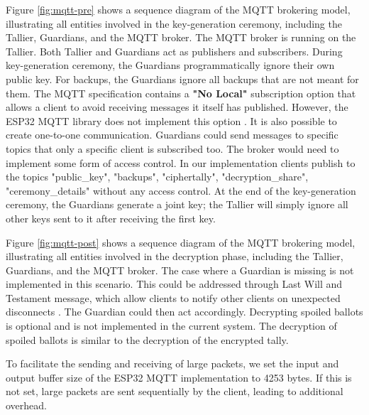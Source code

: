 Figure \ref{fig:mqtt-pre} shows a sequence diagram of the \ac{MQTT} brokering model, illustrating all entities involved in the key-generation ceremony, including the Tallier, Guardians, and the \ac{MQTT} broker. The \ac{MQTT} broker is running on the Tallier. Both Tallier and Guardians act as publishers and subscribers. During key-generation ceremony, the Guardians programmatically ignore their own public key. For backups, the Guardians ignore all backups that are not meant for them. The \ac{MQTT} specification contains a \textbf{"No Local"} \cite[73]{mqtt-v5.0} subscription option that allows a client to avoid receiving messages it itself has published. However, the ESP32 \ac{MQTT} library does not implement this option \cite[53]{esp-prog}. It is also possible to create one-to-one communication. Guardians could send messages to specific topics that only a specific client is subscribed too. The broker would need to implement some form of access control. In our implementation clients publish to the topics "public\_key", "backups", "ciphertally", "decryption\_share", "ceremony\_details" without any access control. At the end of the key-generation ceremony, the Guardians generate a joint key; the Tallier will simply ignore all other keys sent to it after receiving the first key.

Figure \ref{fig:mqtt-post} shows a sequence diagram of the \ac{MQTT} brokering model, illustrating all entities involved in the decryption phase, including the Tallier, Guardians, and the \ac{MQTT} broker. The case where a Guardian is missing is not implemented in this scenario. This could be addressed through Last Will and Testament message, which allow clients to notify other clients on unexpected disconnects \cite[53]{esp-prog}. The Guardian could then act accordingly. Decrypting spoiled ballots is optional and is not implemented in the current system. The decryption of spoiled ballots is similar to the decryption of the encrypted tally.

To facilitate the sending and receiving of large packets, we set the input and output buffer size of the ESP32 MQTT implementation to 4253 bytes. If this is not set, large packets are sent sequentially by the client, leading to additional overhead.

